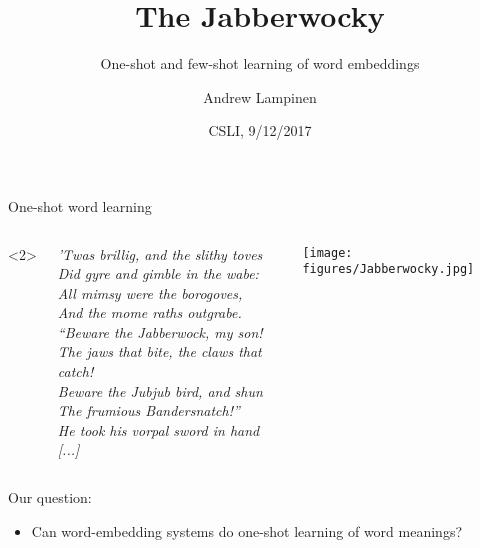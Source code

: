 \documentclass{beamer}
\begin{document}
\title{The Jabberwocky}
\subtitle{One-shot and few-shot learning of word embeddings}
\author{Andrew Lampinen}
\date{CSLI, 9/12/2017}
\frame{\titlepage}

\begin{frame}{One-shot word learning}
\begin{columns}<2>
\begin{column}{0.5\textwidth}
\textit{’Twas brillig, and the slithy toves}\\
\textit{Did gyre and gimble in the wabe:}\\ 
\textit{All mimsy were the borogoves,}\\
\textit{And the mome raths outgrabe.}\\[10pt]

\textit{“Beware the Jabberwock, my son! }\\
\textit{The jaws that bite, the claws that catch!}\\
\textit{Beware the Jubjub bird, and shun}\\ 
\textit{The frumious Bandersnatch!” }\\[10pt]

\textit{He took his vorpal sword in hand}\\
\textit{[...]}
\end{column}
\begin{column}{0.5\textwidth}
\centering
\texttt{[image: figures/Jabberwocky.jpg]}
\end{column}
\end{columns}
\end{frame}

\begin{frame}{Our question:}
\begin{itemize}
    \item<1-> Can word-embedding systems do one-shot learning of word meanings? 
\end{itemize}
\end{frame}
\end{document}
